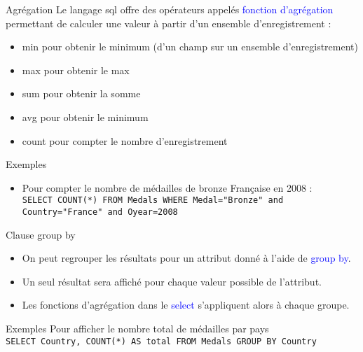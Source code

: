 \documentclass[10pt]{beamer}
\begin{document}
\begin{frame}{\Ctitle}{\stitle}
	\begin{alertblock}{Agrégation}
		Le langage {\sc sql} offre des opérateurs appelés \textcolor{blue}{fonction d'agrégation} permettant de calculer une valeur à partir d'un ensemble d'enregistrement :
		\begin{itemize}
			\item<2-> {\sc min} pour obtenir le minimum (d'un champ sur un ensemble d'enregistrement)
			\item<3-> {\sc max} pour obtenir le max
			\item<4-> {\sc sum} pour obtenir la somme
			\item<5-> {\sc avg} pour obtenir le minimum
			\item<6-> {\sc count} pour compter le nombre d'enregistrement
		\end{itemize}
	\end{alertblock}
	\begin{exampleblock}{Exemples}
		\begin{itemize}
			\item<7-> Pour compter le nombre de médailles de bronze Française en 2008 :\\
				\onslide<8->\texttt{SELECT COUNT(*) FROM Medals WHERE Medal="Bronze" and Country="France" and Oyear=2008}
		\end{itemize}
	\end{exampleblock}
\end{frame}

\begin{frame}{\Ctitle}{\stitle}
	\begin{alertblock}{Clause {\sc group by}}
		\begin{itemize}
			\item<1-> On peut regrouper les résultats pour un attribut donné à l'aide de \textcolor{blue}{\sc group by}.
			\item<2-> Un seul résultat sera affiché pour chaque valeur possible de l'attribut.
			\item<3-> Les fonctions d'agrégation dans le \textcolor{blue}{\sc select} s'appliquent alors à chaque groupe.
		\end{itemize}
	\end{alertblock}
	\begin{exampleblock}{Exemples}
		Pour afficher le nombre total de médailles par pays\\
		\onslide<4->\texttt{SELECT Country, COUNT(*) AS total FROM Medals GROUP BY Country}
	\end{exampleblock}
\end{frame}
\end{document}
